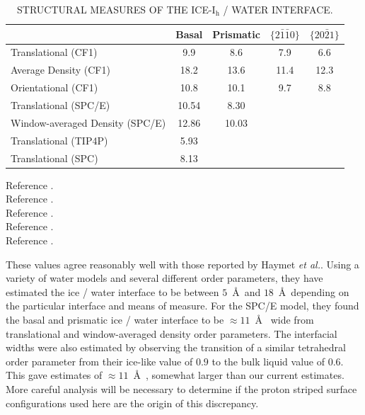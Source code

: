 \begin{table}[h]
\centering
\caption{STRUCTURAL MEASURES OF THE ICE-I$_\mathrm{h}$ / WATER
  INTERFACE. \label{tab:structCompare}} 
\begin{tabular}{|l|cccc|}  
\hline
& Basal & Prismatic & $\{2\bar{1}\bar{1}0\}$ & $\{20\bar{2}1\}$ \\
\hline
Translational (CF1)\footnotemark[1] & 9.9 & 8.6  & 7.9 & 6.6 \\
Average Density (CF1)\footnotemark[1] & 18.2 & 13.6 & 11.4 & 12.3 \\
Orientational (CF1)\footnotemark[2] & 10.8 & 10.1 & 9.7 & 8.8 \\
Translational (SPC/E)\footnotemark[5] & 10.54 & 8.30 & & \\
Window-averaged Density (SPC/E) \footnotemark[5] & 12.86 & 10.03 & & \\
Translational (TIP4P)\footnotemark[3] & 5.93 & & & \\
Translational (SPC)\footnotemark[4] & 8.13 & & & \\
\hline
\end{tabular}
\flushleft
  \footnotemark[1]\footnotesize{Reference \cite{Hayward2001}.} \\
  \footnotemark[2]\footnotesize{Reference \cite{Hayward2002}.} \\
  \footnotemark[3]\footnotesize{Reference \cite{Karim1988}.} \\
  \footnotemark[4]\footnotesize{Reference \cite{Karim1990}.} \\
  \footnotemark[5]\footnotesize{Reference \cite{Bryk2002}.} \\
\end{table}








These values agree reasonably well with those reported by Haymet
\textit{et
  al.}.\cite{Karim1988,Karim1990,Hayward2001,Bryk2002,Hayward2002,Bryk2004}
Using a variety of water models and several different order
parameters, they have estimated the ice / water interface to be
between $5$~\AA~and $18$~\AA~depending on the particular interface and
means of measure.  For the SPC/E model, they found the basal and
prismatic ice / water interface to be $\approx 11$~\AA~ wide from
translational and window-averaged density order parameters. The
interfacial widths were also estimated by observing the transition of
a similar tetrahedral order parameter from their ice-like value of
$0.9$ to the bulk liquid value of $0.6$. This gave estimates of
$\approx 11$~\AA~, somewhat larger than our current estimates. More
careful analysis will be necessary to determine if the proton striped
surface configurations used here are the origin of this discrepancy.

